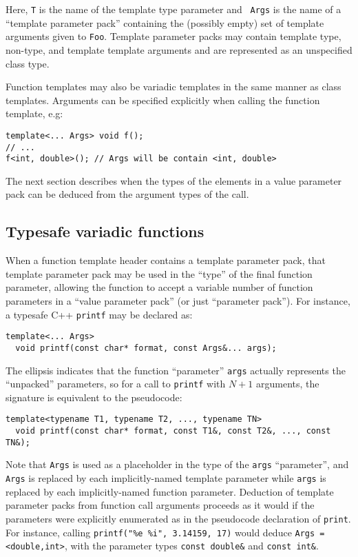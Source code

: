 \documentclass{article}
\begin{document}
\noindent
Here, {\tt T} is the name of the template type parameter and {\tt
  Args} is the name of a ``template parameter pack'' containing the
(possibly empty) set of template arguments given to {\tt Foo}.
Template parameter packs may contain template type, non-type, and
template template arguments and are represented as an unspecified
class type.

Function templates may also be variadic templates in the same manner
as class templates.  Arguments can be specified explicitly when
calling the function template, e.g:

\begin{verbatim}
template<... Args> void f();
// ... 
f<int, double>(); // Args will be contain <int, double>
\end{verbatim}
The next section describes when the types of the elements in 
a value parameter pack can be deduced from the argument types
of the call. 

\subsection{Typesafe variadic functions}
When a function template header contains a template parameter pack,
that template parameter pack may be used in the ``type'' of the final
function parameter, allowing the function to accept a variable number
of function parameters in a ``value parameter pack'' (or just
``parameter pack''). For instance, a typesafe C++ {\tt printf} may
be declared as:
\begin{verbatim}
template<... Args>
  void printf(const char* format, const Args&... args);
\end{verbatim}

\noindent The ellipsis indicates that the function ``parameter''
\texttt{args}
actually represents the ``unpacked'' parameters, so for a call to
\texttt{printf} with $N+1$ arguments, the signature is equivalent to
the pseudocode:

\begin{verbatim}
template<typename T1, typename T2, ..., typename TN>
  void printf(const char* format, const T1&, const T2&, ..., const TN&);
\end{verbatim}

\noindent 
Note that \texttt{Args} is used as a placeholder in the type of the
\texttt{args} ``parameter'', and \texttt{Args} is replaced by each
implicitly-named template parameter while \texttt{args} is replaced by
each implicitly-named function parameter. Deduction of template
parameter packs from function call arguments proceeds as it would if
the parameters were explicitly enumerated as in the pseudocode
declaration of \texttt{print}. For instance, calling
\texttt{printf("\%e \%i", 3.14159, 17)} would deduce \texttt{Args =
  <double,int>}, with the parameter types \texttt{const double\&} and
\texttt{const int\&}.
\end{document}
